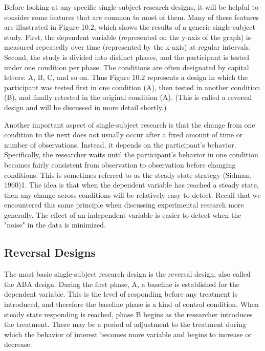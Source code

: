 Before looking at any specific single-subject research designs, it will be helpful to consider some features that are common to most of them. Many of these features are illustrated in Figure 10.2, which shows the results of a generic single-subject study. First, the dependent variable (represented on the y-axis of the graph) is measured repeatedly over time (represented by the x-axis) at regular intervals. Second, the study is divided into distinct phases, and the participant is tested under one condition per phase. The conditions are often designated by capital letters: A, B, C, and so on. Thus Figure 10.2 represents a design in which the participant was tested first in one condition (A), then tested in another condition (B), and finally retested in the original condition (A). (This is called a reversal design and will be discussed in more detail shortly.)

Another important aspect of single-subject research is that the change from one condition to the next does not usually occur after a fixed amount of time or number of observations. Instead, it depends on the participant's behavior. Specifically, the researcher waits until the participant's behavior in one condition becomes fairly consistent from observation to observation before changing conditions. This is sometimes referred to as the steady state strategy (Sidman, 1960)1. The idea is that when the dependent variable has reached a steady state, then any change across conditions will be relatively easy to detect. Recall that we encountered this same principle when discussing experimental research more generally. The effect of an independent variable is easier to detect when the "noise" in the data is minimized.

\subsection{Reversal Designs}

The most basic single-subject research design is the reversal design, also called the ABA design. During the first phase, A, a baseline is established for the dependent variable. This is the level of responding before any treatment is introduced, and therefore the baseline phase is a kind of control condition. When steady state responding is reached, phase B begins as the researcher introduces the treatment. There may be a period of adjustment to the treatment during which the behavior of interest becomes more variable and begins to increase or decrease. 



